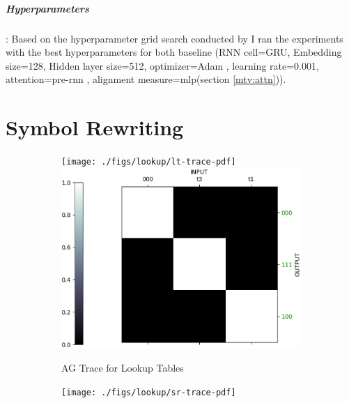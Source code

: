 \subparagraph{Hyperparameters}: Based on the hyperparameter grid search conducted by \cite{Hupkes2018} I ran the experiments with the best hyperparameters for both baseline (RNN cell=GRU, Embedding size=128, Hidden layer size=512, optimizer=Adam \citep{KingmaB14}, learning rate=0.001, attention=pre-rnn \citep{Bahdanau2014}, alignment measure=mlp(section \ref{mtv:attn})).

\section{Symbol Rewriting} \label{exp:sr}

\begin{figure}[ht] 
	\begin{subfigure}[b]{0.5\linewidth}
		\centering
		\ifpdf
		\texttt{[image: ./figs/lookup/lt-trace-pdf]}
		\else
		\includegraphics[width=0.95\linewidth]{./figs/lookup/lt-trace-eps}
		\fi
		\caption{AG Trace for Lookup Tables} 
		\label{ag_lt} 
		\vspace{2ex}
	\end{subfigure}%
	\begin{subfigure}[b]{0.5\linewidth}
		\centering
		\ifpdf
		\texttt{[image: ./figs/lookup/sr-trace-pdf]}
		\else

\end{subfigure}
\end{figure}
